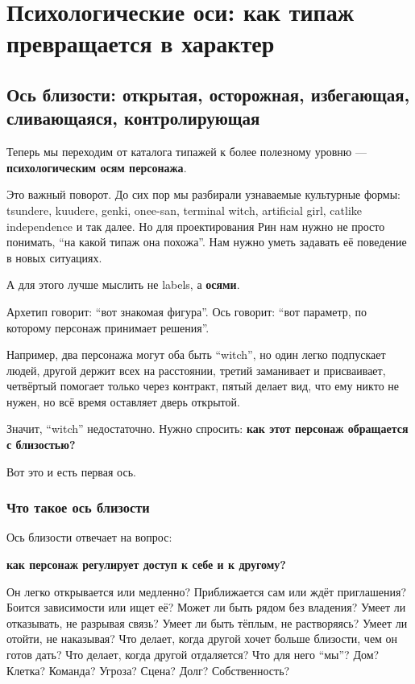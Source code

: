 \setcounter{chapter}{4}
\chapter{Психологические оси: как типаж превращается в характер}

\setcounter{section}{0}
\section{Ось близости: открытая, осторожная, избегающая, сливающаяся, контролирующая}

Теперь мы переходим от каталога типажей к более полезному уровню ---
\textbf{психологическим осям персонажа}.

Это важный поворот. До сих пор мы разбирали узнаваемые культурные формы:
tsundere, kuudere, genki, onee-san, terminal witch, artificial girl,
catlike independence и так далее. Но для проектирования Рин нам нужно не
просто понимать, ``на какой типаж она похожа''. Нам нужно уметь задавать
её поведение в новых ситуациях.

А для этого лучше мыслить не labels, а \textbf{осями}.

Архетип говорит: ``вот знакомая фигура''. Ось говорит: ``вот параметр,
по которому персонаж принимает решения''.

Например, два персонажа могут оба быть ``witch'', но один легко
подпускает людей, другой держит всех на расстоянии, третий заманивает и
присваивает, четвёртый помогает только через контракт, пятый делает вид,
что ему никто не нужен, но всё время оставляет дверь открытой.

Значит, ``witch'' недостаточно. Нужно спросить: \textbf{как этот
персонаж обращается с близостью?}

Вот это и есть первая ось.

\subsection*{Что такое ось близости}

Ось близости отвечает на вопрос:

\textbf{как персонаж регулирует доступ к себе и к другому?}

Он легко открывается или медленно? Приближается сам или ждёт
приглашения? Боится зависимости или ищет её? Может ли быть рядом без
владения? Умеет ли отказывать, не разрывая связь? Умеет ли быть тёплым,
не растворяясь? Умеет ли отойти, не наказывая? Что делает, когда другой
хочет больше близости, чем он готов дать? Что делает, когда другой
отдаляется? Что для него ``мы''? Дом? Клетка? Команда? Угроза? Сцена?
Долг? Собственность?

